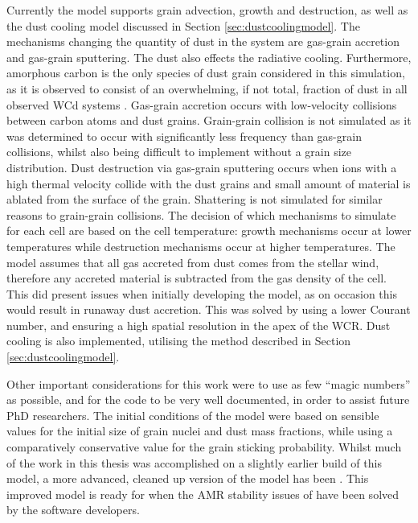 Currently the \bidmas{} model supports grain advection, growth and destruction, as well as the dust cooling model discussed in Section \ref{sec:dustcoolingmodel}.
The mechanisms changing the quantity of dust in the system are gas-grain accretion and gas-grain sputtering.
The dust also effects the radiative cooling.
Furthermore, amorphous carbon is the only species of dust grain considered in this simulation, as it is observed to consist of an overwhelming, if not total, fraction of dust in all observed WCd systems \parencite{crowther_dust_2003}.
Gas-grain accretion occurs with low-velocity collisions between carbon atoms and dust grains.
Grain-grain collision is not simulated as it was determined to occur with significantly less frequency than gas-grain collisions, whilst also being difficult to implement without a grain size distribution.
Dust destruction via gas-grain sputtering occurs when ions with a high thermal velocity collide with the dust grains and small amount of material is ablated from the surface of the grain.
Shattering is not simulated for similar reasons to grain-grain collisions.
The decision of which mechanisms to simulate for each cell are based on the cell temperature: growth mechanisms occur at lower temperatures while destruction mechanisms occur at higher temperatures.
The \bidmas{} model assumes that all gas accreted from dust comes from the stellar wind, therefore any accreted material is subtracted from the gas density of the cell.
This did present issues when initially developing the model, as on occasion this would result in runaway dust accretion.
This was solved by using a lower Courant number, and ensuring a high spatial resolution in the apex of the WCR.
Dust cooling is also implemented, utilising the method described in Section \ref{sec:dustcoolingmodel}. 

Other important considerations for this work were to use as few ``magic numbers'' as possible, and for the code to be very well documented, in order to assist future PhD researchers.
The initial conditions of the model were based on sensible values for the initial size of grain nuclei and dust mass fractions, while using a comparatively conservative value for the grain sticking probability.
Whilst much of the work in this thesis was accomplished on a slightly earlier build of this model, a more advanced, cleaned up version of the model has been .
This improved model is ready for when the AMR stability issues of \athena{} have been solved by the software developers.

